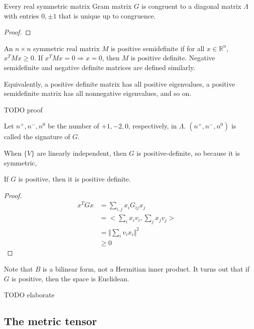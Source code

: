 \documentclass[12pt,letterpaper,titlepage,twoside]{article}
\begin{document}
\begin{theorem}[Sylvestor]
Every real symmetric matrix Gram matrix $G$ is congruent to a diagonal matrix $Λ$ with entries $0,±1$ that is unique up to congruence.
\end{theorem}
\begin{proof}
  
\end{proof}

\begin{definition}
An $n×n$ symmetric real matrix $M$ is positive semidefinite if for all $x∈ ℝ ^n$, $x^{T}Mx≥0$.
If $x^{T}Mx=0⇒ x=0$, then $M$ is positive definite.
Negative semidefinite and negative definite matrices are defined similarly.
\end{definition}

Equivalently, a positive definite matrix has all positive eigenvalues, a positive semidefinite matrix has all nonnegative eigenvalues, and so on.

TODO proof

\begin{definition}[signature]
Let $n^+,n^-,n^0$ be the number of $+1,-2,0$, respectively, in $Λ$.
$(n^+,n^-,n^0)$ is called the signature of $G$.
\end{definition}

When $\{V\}$ are linearly independent, then $G$ is positive-definite, so because it is symmetric, 

\begin{theorem}
If $G$ is positive, then it is positive definite.
\end{theorem}
\begin{proof}
\begin{equation*}
\begin{split}
  x^{T}Gx
&=∑_{i,j}x_i G_{ij} x_j \\
&=<∑_i x_i v_i,∑_j x_j v_j> \\
&=\Vert ∑_i v_i x_i \Vert^2 \\
&≥0
\end{split}
\end{equation*}
\end{proof}

Note that $B$ is a bilinear form, not a Hermitian inner product.
It turns out that if $G$ is positive, then the space is Euclidean.

TODO elaborate

\subsection{The metric tensor}
\end{document}
